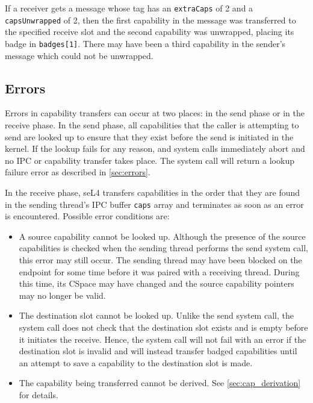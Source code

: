 If a receiver gets a message whose tag has an \texttt{extraCaps} of 2 and a
\texttt{capsUnwrapped} of 2, then the first capability in the message was
transferred to the specified receive slot and the second capability was
unwrapped, placing its badge in \texttt{badges[1]}. There may have been a
third capability in the sender's message which could not be unwrapped.

\subsection{Errors}

Errors in capability transfers can occur at two places: in the send
phase or in the receive phase. In the send phase, all capabilities that
the caller is attempting to send are looked up to ensure that they exist
before the send is initiated in the kernel. If the lookup fails for any
reason,  and  system calls immediately abort and
no IPC or capability transfer takes place. The system call will return
a lookup failure error as described in \autoref{sec:errors}.

In the receive phase, seL4 transfers capabilities in the order that they
are found in the sending thread's IPC buffer \texttt{caps} array
and terminates as soon as an error is encountered. Possible error
conditions are:

\begin{itemize}
    \item A source capability cannot be looked up. Although the presence
    of the source capabilities is checked when the sending thread
    performs the send system call, this error may still occur. The sending
    thread may have been blocked on the endpoint for some time before it
    was paired with a receiving thread. During this time, its
    CSpace may have changed and the source capability pointers may
    no longer be valid.

    \item The destination slot cannot be looked up. Unlike the send
    system call, the  system call does not check that the
    destination slot exists and is empty before it initiates the receive.
    Hence, the  system call will not fail with an error if the
    destination slot is invalid and will instead transfer badged
    capabilities until an attempt to save a capability to the
    destination slot is made.

    \item The capability being transferred cannot be derived. See
    \autoref{sec:cap_derivation} for details.
\end{itemize}

